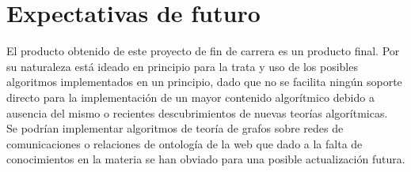 \section{Expectativas de futuro}

El producto obtenido de este proyecto de fin de carrera es un producto final. Por su naturaleza está ideado en principio para la trata y uso de los posibles algoritmos implementados en un principio, dado que no se facilita ningún soporte directo para la implementación de un mayor contenido algorítmico debido a ausencia del mismo o recientes descubrimientos de nuevas teorías algorítmicas.\\

Se podrían implementar algoritmos de teoría de grafos sobre redes de comunicaciones o relaciones de ontología de la web que dado a la falta de conocimientos en la materia se han obviado para una posible actualización futura.\\


